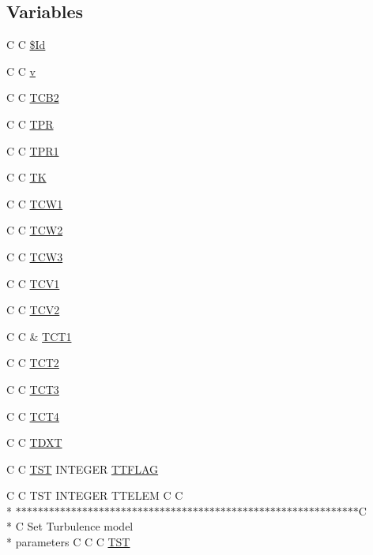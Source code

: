 \subsection*{Variables}
\begin{DoxyCompactItemize}
\item 
C C \hyperlink{turb_8com_af40bd3a96fc1553c00422342f92046b8}{\$\-Id}
\item 
C C \hyperlink{turb_8com_a8961853e9a171af64fe80e35da93a2e0}{v}
\item 
C C \hyperlink{turb_8com_aa029a08b7d96afae971ad6b66644fc47}{T\-C\-B2}
\item 
C C \hyperlink{turb_8com_a1cdd3ae76891adc9d5f8b97f568754f7}{T\-P\-R}
\item 
C C \hyperlink{turb_8com_ae1602f83f51f820f66d55f31c5644321}{T\-P\-R1}
\item 
C C \hyperlink{turb_8com_ae11f19404c6108c51e039cc2c51e03f9}{T\-K}
\item 
C C \hyperlink{turb_8com_a1dc3dd4171f3b7adca51894571eadeef}{T\-C\-W1}
\item 
C C \hyperlink{turb_8com_a77dcc912c05e0088bac527ca72645095}{T\-C\-W2}
\item 
C C \hyperlink{turb_8com_a982a67475755b91583931e893bba4e88}{T\-C\-W3}
\item 
C C \hyperlink{turb_8com_a2a7f9357b88523ac384a7d4a7ad75fad}{T\-C\-V1}
\item 
C C \hyperlink{turb_8com_a721f4aa91be360eb736c8628fe3bf2b0}{T\-C\-V2}
\item 
C C \& \hyperlink{turb_8com_a303ad05cf974ceddc5009d1f0dd00ac8}{T\-C\-T1}
\item 
C C \hyperlink{turb_8com_a8fed9efb9f6a6fb40cf920135855ffcf}{T\-C\-T2}
\item 
C C \hyperlink{turb_8com_a7018ba2eaa3b6ebcf121e8d87ea8190c}{T\-C\-T3}
\item 
C C \hyperlink{turb_8com_a1f51e8ca66b410b1ce1046689d2e332f}{T\-C\-T4}
\item 
C C \hyperlink{turb_8com_af243bf8446092716e2b3ec512084875a}{T\-D\-X\-T}
\item 
C C \hyperlink{turb_8com_a677fc6bb107acfd381357f761464b300}{T\-S\-T} I\-N\-T\-E\-G\-E\-R \hyperlink{turb_8com_ab410312bc7ffadaca38025fc3fe530a8}{T\-T\-F\-L\-A\-G}
\item 
C C T\-S\-T I\-N\-T\-E\-G\-E\-R T\-T\-E\-L\-E\-M C C \\*
$\ast$$\ast$$\ast$$\ast$$\ast$$\ast$$\ast$$\ast$$\ast$$\ast$$\ast$$\ast$$\ast$$\ast$$\ast$$\ast$$\ast$$\ast$$\ast$$\ast$$\ast$$\ast$$\ast$$\ast$$\ast$$\ast$$\ast$$\ast$$\ast$$\ast$$\ast$$\ast$$\ast$$\ast$$\ast$$\ast$$\ast$$\ast$$\ast$$\ast$$\ast$$\ast$$\ast$$\ast$$\ast$$\ast$$\ast$$\ast$$\ast$$\ast$$\ast$$\ast$$\ast$$\ast$$\ast$$\ast$$\ast$$\ast$$\ast$$\ast$$\ast$$\ast$C \\*
C Set Turbulence model \\*
parameters C C C \hyperlink{turb_8com_a677fc6bb107acfd381357f761464b300}{T\-S\-T}
\end{DoxyCompactItemize}


